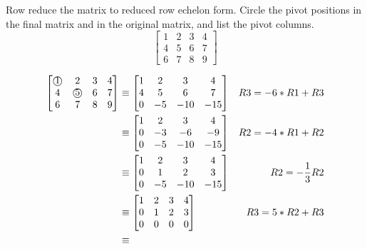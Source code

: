 \documentclass{../mathhomework}
\newcommand{\circnum}[1]{\text{\textcircled{#1}}}
\begin{document}
\begin{problem}[1.2\#3]
    Row reduce the matrix to reduced row echelon form. Circle the pivot positions in the final matrix and in the original matrix, and list the pivot columns.
    $$\begin{bmatrix}
        1 & 2 & 3 & 4 \\
        4 & 5 & 6 & 7 \\
        6 & 7 & 8 & 9
    \end{bmatrix}$$

    \begin{solution}
        \begin{align*}
            \begin{bmatrix}
                \circnum{1} & 2 & 3 & 4 \\
                4 & \circnum{5} & 6 & 7 \\
                6 & 7 & 8 & 9
            \end{bmatrix}
            & \equiv
            \begin{bmatrix}
                1 & 2 & 3 & 4 \\
                4 & 5 & 6 & 7 \\
                0 & -5 & -10 & -15
            \end{bmatrix}
            & R3 = -6 * R1 + R3 \\ & \equiv
            \begin{bmatrix}
                1 & 2 & 3 & 4 \\
                0 & -3 & -6 & -9 \\
                0 & -5 & -10 & -15
            \end{bmatrix}
            & R2 = -4 * R1 + R2 \\ & \equiv
            \begin{bmatrix}
                1 & 2 & 3 & 4 \\
                0 & 1 & 2 & 3 \\
                0 & -5 & -10 & -15
            \end{bmatrix}
            & R2 = -\frac{1}{3} R2 \\ & \equiv
            \begin{bmatrix}
                1 & 2 & 3 & 4 \\
                0 & 1 & 2 & 3 \\
                0 & 0 & 0 & 0
            \end{bmatrix}
            & R3 = 5 * R2 + R3 \\ & \equiv

\end{align*}
\end{solution}
\end{problem}
\end{document}
